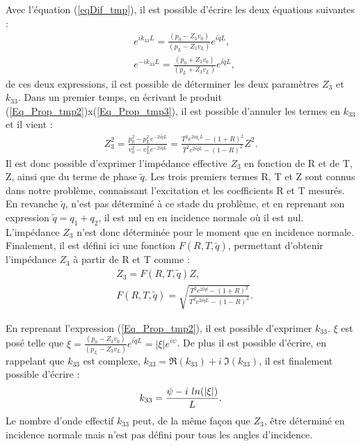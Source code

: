 \documentclass[twoside,openright]{report}
\begin{document}
    Avec l'équation (\ref{eqDif_tmp}), il est possible d'écrire les deux équations suivantes :
    \begin{align}
        &e^{i k_{33}L}=\frac{(p_0-Z_3v_0)}{(p_L-Z_3v_L)}e^{i\tilde{q}L},\label{Eq_Prop_tmp2}\\
        &e^{-i k_{33}L}=\frac{(p_0+Z_3v_0)}{(p_L+Z_3v_L)}e^{i\tilde{q}L},\label{Eq_Prop_tmp3}
    \end{align}
    de ces deux expressions, il est possible de déterminer les deux paramètres $Z_3$ et $k_{33}$.
    Dans un premier temps, en écrivant le produit (\ref{Eq_Prop_tmp2})x(\ref{Eq_Prop_tmp3}), il est possible d'annuler les termes en $k_{33}$ et il vient : 
    \begin{align}
    Z_3^2=\frac{p_0^2-p_L^2e^{-2i\tilde{q}L}}{v_0^2-v_L^2e^{-2i\tilde{q}L}}=\frac{T^2e^{2iq_1L}-(1+R)^2}{T^2e^{2i\tilde{q}L}-(1-R)^2}Z^2.\label{Z3_tmp}
    \end{align}
    Il est donc possible d'exprimer l'impédance effective $Z_3$ en fonction de R et de T, Z, ainsi que du terme de phase $\tilde{q}$. Les trois premiers termes R, T et Z sont connus dans notre problème, connaissant l'excitation et les coefficients R et T mesurés. En revanche $\tilde{q}$, n'est pas déterminé à ce stade du problème, et en reprenant son expression $\tilde{q}=q_1+q_2$, il est nul en en incidence normale où il est nul. L'impédance $Z_3$ n'est donc déterminée pour le moment que en incidence normale. Finalement, il est défini ici une fonction $F(R,T,\tilde{q})$, permettant d'obtenir l'impédance $Z_3$ à partir de R et T comme :
    \begin{align}
    &Z_3=F(R,T,\tilde{q})Z,\label{Z3}\\
    &F(R,T,\tilde{q})=\sqrt{\frac{T^2e^{2i\tilde{q}l}-(1+R)^2}{T^2e^{2i\tilde{q}L}-(1-R)^2}}.\label{F(R,T,q)}
    \end{align}

    
    En reprenant l'expression (\ref{Eq_Prop_tmp2}), il est possible d'exprimer $k_{33}$. $\xi$ est posé telle que $\xi=\frac{(p_0-Z_3v_0)}{(p_L-Z_3v_L)}e^{i\tilde{q}L}=|\xi|e^{i\psi}$. De plus il est possible d'écrire, en rappelant que $k_{33}$ est complexe, $k_{33}=\Re(k_{33})+i\ \Im(k_{33})$, il est finalement possible d'écrire :
     \begin{align}
        k_{33}=\frac{\psi-i\ ln(|\xi|)}{L}\label{k_{33}}.
    \end{align}
    Le nombre d'onde effectif $k_{33}$ peut, de la même façon que $Z_3$, être déterminé en incidence normale mais n'est pas défini pour tous les angles d'incidence.
    
\end{document}
